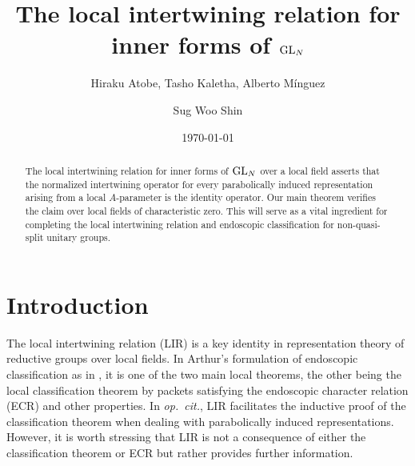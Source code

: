 \documentclass[11pt,reqno]{amsart}
\theoremstyle{plain}
\theoremstyle{definition}
\newcommand{\GL}{\tu{GL}}
\newcommand{\tu}{\textup}
\numberwithin{equation}{subsection}
\begin{document}
\title{The local intertwining relation for inner forms of $\GL_N$}



\author[
H. Atobe, T. Kaletha, A. M{\'i}nguez, S. W. Shin
]
{Hiraku Atobe, 
Tasho Kaletha, 
Alberto M\'inguez
\and
Sug Woo Shin
}

\address{
Department of Mathematics, Kyoto University, 
Kitashirakawa-Oiwake-cho, Sakyo-ku, Kyoto, 606-8502, Japan
}

\address{
Bonn, Germany
}

\address{
Departamento de \'Algebra and Instituto de Matem\'aticas (IMUS), Universidad de Sevilla, C/ Tarifa s/n, 41012 Sevilla, Espa\~{n}a
}

\address{
Department of Mathematics, UC Berkeley, 
Berkeley, CA 94720, USA 
/ 
Korea Institute for Advanced Study, 
Seoul 02455, Republic of Korea
}



\date{\today}

\begin{abstract}
The local intertwining relation for inner forms of $\GL_N$ over a local field asserts that the normalized intertwining operator for every parabolically induced representation arising from a local $A$-parameter is the identity operator. Our main theorem verifies the claim over local fields of characteristic zero. This will serve as a vital ingredient for completing the local intertwining relation and endoscopic classification for non-quasi-split unitary groups.
\end{abstract}

\maketitle

\setcounter{tocdepth}{1}
\tableofcontents

\section{Introduction}


The local intertwining relation (LIR) is a key identity in representation theory of reductive groups over local fields. In Arthur’s formulation of endoscopic classification as in \cite{Arthur}, it is one of the two main local theorems, the other being the local classification theorem by packets satisfying the endoscopic character relation (ECR) and other properties. In \emph{op.~cit.}, LIR facilitates the inductive proof of the classification theorem when dealing with parabolically induced representations. However, it is worth stressing that LIR is not a consequence of either the classification theorem or ECR but rather provides further information. 
\end{document}
